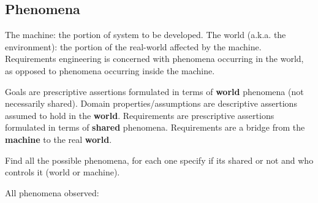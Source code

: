 \subsection{Phenomena}
\label{subsect:phenomena}

The machine: the portion of system to be developed.
The world (a.k.a. the environment): the portion of the real-world affected by the machine.
Requirements engineering is concerned with phenomena occurring in the world, as opposed to phenomena occurring inside the machine.

Goals are prescriptive assertions formulated in terms of \textbf{world} phenomena (not necessarily shared).
Domain properties/assumptions are descriptive assertions assumed to hold in the \textbf{world}.
Requirements are prescriptive assertions formulated in terms of \textbf{shared} phenomena.
Requirements are a bridge from the \textbf{machine} to the real \textbf{world}.

Find all the possible phenomena, for each one specify if its shared or not and who controls it (world or machine). 

All phenomena observed:

